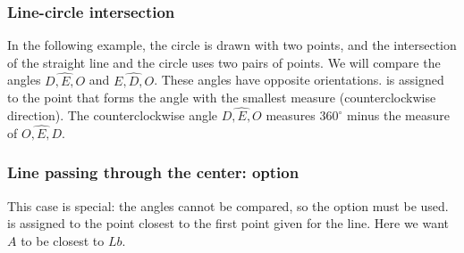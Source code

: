 \subsubsection{Line-circle intersection}

In the following example, the circle is drawn with two points, and the intersection of the straight line and the circle uses two pairs of points. We will compare the angles $\widehat{D,E,O}$ and $\widehat{E,D,O}$. These angles have opposite orientations.  is assigned to the point that forms the angle with the smallest measure (counterclockwise direction). The counterclockwise angle $\widehat{D,E,O}$ measures $360^\circ$ minus the measure of $\widehat{O,E,D}$.

\begin{tkzexample}[width=0pt,small]
\end{tkzexample}

\subsubsection{Line passing through the center: option }
This case is special: the angles cannot be compared, so the option  must be used.  is assigned to the point closest to the first point given for the line. Here we want $A$ to be closest to $Lb$.

\begin{tkzexample}[latex=8cm,small]
\end{tkzexample}

